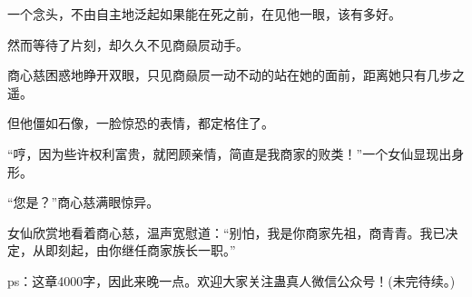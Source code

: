 \begin{this_body}
一个念头，不由自主地泛起如果能在死之前，在见他一眼，该有多好。

然而等待了片刻，却久久不见商赑屃动手。

商心慈困惑地睁开双眼，只见商赑屃一动不动的站在她的面前，距离她只有几步之遥。

但他僵如石像，一脸惊恐的表情，都定格住了。

“哼，因为些许权利富贵，就罔顾亲情，简直是我商家的败类！”一个女仙显现出身形。

“您是？”商心慈满眼惊异。

女仙欣赏地看着商心慈，温声宽慰道：“别怕，我是你商家先祖，商青青。我已决定，从即刻起，由你继任商家族长一职。”

ps：这章4000字，因此来晚一点。欢迎大家关注蛊真人微信公众号！(未完待续。)

\end{this_body}

